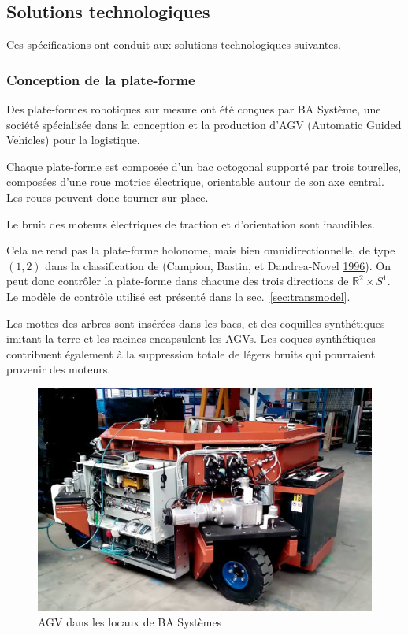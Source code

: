 \documentclass[french,A4paper,]{book}
\begin{document}
\subsection{Solutions technologiques}\label{solutions-technologiques}

Ces spécifications ont conduit aux solutions technologiques suivantes.

\subsubsection{Conception de la
plate-forme}\label{conception-de-la-plate-forme}

Des plate-formes robotiques sur mesure ont été conçues par BA Système,
une société spécialisée dans la conception et la production d'AGV
(Automatic Guided Vehicles) pour la logistique.

Chaque plate-forme est composée d'un bac octogonal supporté par trois
tourelles, composées d'une roue motrice électrique, orientable autour de
son axe central. Les roues peuvent donc tourner sur place.

Le bruit des moteurs électriques de traction et d'orientation sont
inaudibles.

Cela ne rend pas la plate-forme holonome, mais bien omnidirectionnelle,
de type \((1, 2)\) dans la classification de (Campion, Bastin, et
Dandrea-Novel \protect\hyperlink{ref-campion96}{1996}). On peut donc
contrôler la plate-forme dans chacune des trois directions de
\(\mathbb{R}^2\times S^1\). Le modèle de contrôle utilisé est présenté
dans la sec.~\ref{sec:transmodel}.

Les mottes des arbres sont insérées dans les bacs, et des coquilles
synthétiques imitant la terre et les racines encapsulent les AGVs. Les
coques synthétiques contribuent également à la suppression totale de
légers bruits qui pourraient provenir des moteurs.

\begin{figure}
\centering
\includegraphics[width=1.00000\textwidth]{imgs/capture_video_BA.jpg}
\caption{AGV dans les locaux de BA Systèmes}
\end{figure}
\end{document}
